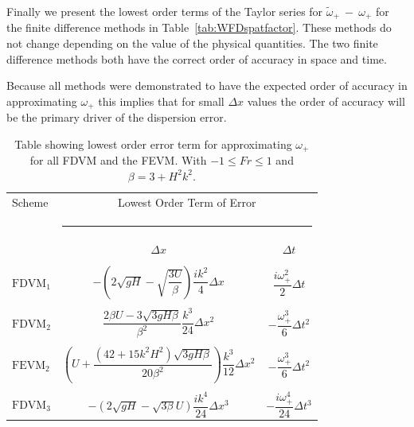 Finally we present the lowest order terms of the Taylor series for $\widetilde{\omega}_+~-~\omega_+$ for the finite difference methods in Table~\ref{tab:WFDspatfactor}. These methods do not change depending on the value of the physical quantities. The two finite difference methods both have the correct order of accuracy in space and time.  

Because all methods were demonstrated to have the expected order of accuracy in approximating $\omega_+$ this implies that for small $\Delta x$ values the order of accuracy will be the primary driver of the dispersion error.

	\begin{table}
		\begin{tabular}{l  c  c}
		\hline
			Scheme & \multicolumn{2}{c}{Lowest Order Term of Error}\\
			&  \multicolumn{2}{l}{\rule{0.7\textwidth}{0.4pt}} \\
			& $\Delta x$&$\Delta t$\\
			\hline && \\
			$\text{FDVM}_1$& $-\left(2 \sqrt{gH} - \sqrt{\dfrac{3U}{\beta }}\right)  \dfrac{ik^2}{4} \Delta x$ & $\dfrac{i \omega_+^2}{2} \Delta t$ \\ & & \\
			$\text{FDVM}_2$& $\dfrac{2\beta U -3 \sqrt{3 gH \beta}}{\beta^2}  \dfrac{k^3}{24}\Delta x ^2$ & $- \dfrac{\omega^3_+}{6 }  \Delta t^2$ \\ & & \\
			$\text{FEVM}_2$& $\left(U   + \dfrac{\left(42 + 15 k^2H^2\right) \sqrt{3gH \beta}}{20\beta^2}  \right) \dfrac{k^3}{12 } \Delta x^2$ &  $- \dfrac{\omega^3_+}{6 }  \Delta t^2$  \\ & & \\
			$\text{FDVM}_3$& $-\left({2\sqrt{gH} - \sqrt{3\beta}U }\right) \dfrac{ik^4}{24} \Delta x^3$ & $-\dfrac{i\omega^4_+}{24 } \Delta t^3$ \\ \hline
		\end{tabular}
		\caption{Table showing lowest order error term for approximating $\omega_+$ for all FDVM and the FEVM. With $  -1 \le Fr \le 1$ and $\beta = 3 + H^2 k^2 $. }
		\label{tab:Wfactor} 
	\end{table}

